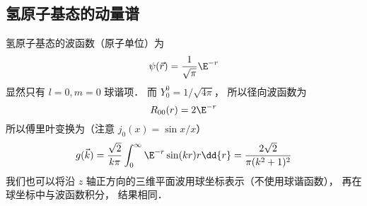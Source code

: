 \subsection{氢原子基态的动量谱}
氢原子基态的波函数（原子单位）为
\begin{equation}
\psi(\vec r) = \frac{1}{\sqrt\pi} \E^{-r}
\end{equation}
显然只有 $l = 0, m = 0$ 球谐项． 而 $Y_0^0 = 1/\sqrt{4\pi}$， 所以径向波函数为
\begin{equation}
R_{00}(r) = 2 \E^{-r}
\end{equation}
所以傅里叶变换为（注意 $j_0(x) = \sin x/x$）
\begin{equation}
g(\vec k) = \frac{\sqrt{2}}{k\pi} \int_0^\infty \E^{-r} \sin(kr) r \dd{r} = \frac{2\sqrt{2}}{\pi(k^2+1)^2}
\end{equation}
我们也可以将沿 $z$ 轴正方向的三维平面波用球坐标表示（不使用球谐函数）， 再在球坐标中与波函数积分， 结果相同．
